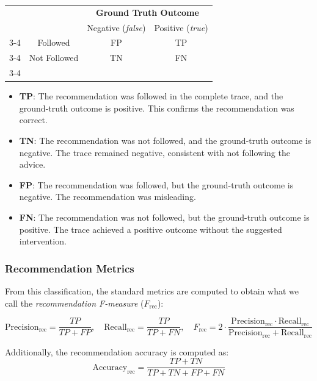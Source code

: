 \documentclass{article}
\begin{document}
\begin{center}
\begin{tabular}{cc|c|c|}
& \multicolumn{1}{c}{} & \multicolumn{2}{c}{\textbf{Ground Truth Outcome}} \\
& \multicolumn{1}{c}{} & \multicolumn{1}{c}{Negative (\textit{false})}  & \multicolumn{1}{c}{Positive (\textit{true})} \\\cline{3-4}
\multirow{2}{*}{\textbf{Recommendation}} & Followed     & FP & TP \\\cline{3-4}
                                          & Not Followed & TN & FN \\\cline{3-4}
\end{tabular}
\end{center}

\begin{itemize}
    \item \textbf{TP}: The recommendation was followed in the complete trace, and the ground-truth outcome is positive. This confirms the recommendation was correct.
    \item \textbf{TN}: The recommendation was not followed, and the ground-truth outcome is negative. The trace remained negative, consistent with not following the advice.
    \item \textbf{FP}: The recommendation was followed, but the ground-truth outcome is negative. The recommendation was misleading.
    \item \textbf{FN}: The recommendation was not followed, but the ground-truth outcome is positive. The trace achieved a positive outcome without the suggested intervention.
\end{itemize}

\subsubsection{Recommendation Metrics}

From this classification, the standard metrics are computed to obtain what we call the \textit{recommendation F-measure} ($F_{\text{rec}}$):

\[
\text{Precision}_{\text{rec}} = \frac{TP}{TP + FP}, \quad
\text{Recall}_{\text{rec}} = \frac{TP}{TP + FN}, \quad
F_{\text{rec}} = 2 \cdot \frac{\text{Precision}_{\text{rec}} \cdot \text{Recall}_{\text{rec}}}{\text{Precision}_{\text{rec}} + \text{Recall}_{\text{rec}}}
\]

\noindent
Additionally, the recommendation accuracy is computed as:
\[
\text{Accuracy}_{\text{rec}} = \frac{TP + TN}{TP + TN + FP + FN}
\]
\end{document}
